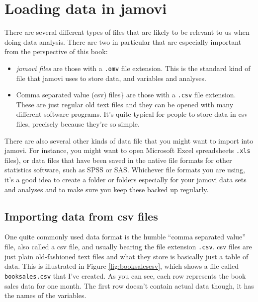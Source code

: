 \documentclass[
]{book}
\providecommand{\tightlist}{%
  \setlength{\itemsep}{0pt}\setlength{\parskip}{0pt}}
\begin{document}
\hypertarget{load}{%
\section{Loading data in jamovi}\label{load}}

There are several different types of files that are likely to be relevant to us when doing data analysis. There are two in particular that are especially important from the perspective of this book:

\begin{itemize}
\tightlist
\item
  \emph{jamovi files} are those with a \texttt{.omv} file extension. This is the standard kind of file that jamovi uses to store data, and variables and analyses.
\item
  Comma separated value (csv) files\} are those with a \texttt{.csv} file extension. These are just regular old text files and they can be opened with many different software programs. It's quite typical for people to store data in csv files, precisely because they're so simple.
\end{itemize}

There are also several other kinds of data file that you might want to import into jamovi. For instance, you might want to open Microsoft Excel spreadsheets \texttt{.xls} files), or data files that have been saved in the native file formats for other statistics software, such as SPSS or SAS. Whichever file formats you are using, it's a good idea to create a folder or folders especially for your jamovi data sets and analyses and to make sure you keep these backed up regularly.

\hypertarget{importing-data-from-csv-files}{%
\subsection{Importing data from csv files}\label{importing-data-from-csv-files}}

One quite commonly used data format is the humble ``comma separated value'' file, also called a csv file, and usually bearing the file extension \texttt{.csv}. csv files are just plain old-fashioned text files and what they store is basically just a table of data. This is illustrated in Figure \ref{fig:booksalescsv}, which shows a file called \texttt{booksales.csv} that I've created. As you can see, each row represents the book sales data for one month. The first row doesn't contain actual data though, it has the names of the variables.
\end{document}
